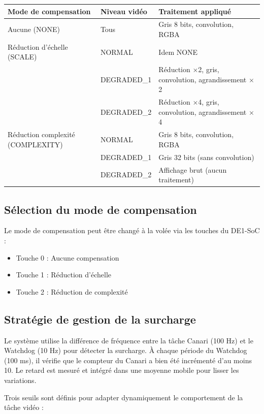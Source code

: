 \documentclass[a4paper,12pt]{article}
\begin{document}
\begin{longtable}{|p{3.2cm}|p{2.8cm}|p{7.5cm}|}
\hline
\textbf{Mode de compensation} & \textbf{Niveau vidéo} & \textbf{Traitement appliqué} \\
\hline
Aucune (NONE) & Tous & Gris 8 bits, convolution, RGBA \\
\hline
Réduction d'échelle (SCALE) & NORMAL & Idem NONE \\
 & DEGRADED\_1 & Réduction $\times$2, gris, convolution, agrandissement $\times$2 \\
 & DEGRADED\_2 & Réduction $\times$4, gris, convolution, agrandissement $\times$4 \\
\hline
Réduction complexité (COMPLEXITY) & NORMAL & Gris 8 bits, convolution, RGBA \\
 & DEGRADED\_1 & Gris 32 bits (sans convolution) \\
 & DEGRADED\_2 & Affichage brut (aucun traitement) \\
\hline
\end{longtable}

\break

\subsection{Sélection du mode de compensation}

Le mode de compensation peut être changé à la volée via les touches du DE1-SoC :
\begin{itemize}
    \item Touche 0 : Aucune compensation
    \item Touche 1 : Réduction d'échelle
    \item Touche 2 : Réduction de complexité
\end{itemize}

\subsection{Stratégie de gestion de la surcharge}

Le système utilise la différence de fréquence entre la tâche Canari (100 Hz) et le Watchdog (10 Hz) pour détecter la surcharge. À chaque période du Watchdog (100 ms), il vérifie que le compteur du Canari a bien été incrémenté d'au moins 10. Le retard est mesuré et intégré dans une moyenne mobile pour lisser les variations.

Trois seuils sont définis pour adapter dynamiquement le comportement de la tâche vidéo :
\end{document}
